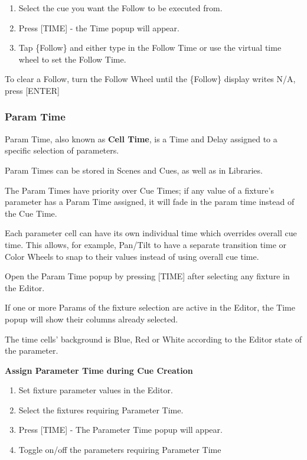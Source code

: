 \documentclass[
]{article}
\begin{document}
\begin{enumerate}
\def\labelenumi{\arabic{enumi}.}
\item
  Select the cue you want the Follow to be executed from.
\item
  Press {[}TIME{]} - the Time popup will appear.
\item
  Tap \{Follow\} and either type in the Follow Time or use the virtual time wheel to set the Follow Time.
\end{enumerate}

To clear a Follow, turn the Follow Wheel until the \{Follow\} display writes N/A, press {[}ENTER{]}

\hypertarget{param-time}{%
\subsubsection{Param Time}\label{param-time}}

Param Time, also known as \textbf{Cell Time}, is a Time and Delay assigned to a specific selection of parameters.

Param Times can be stored in Scenes and Cues, as well as in Libraries.

The Param Times have priority over Cue Times; if any value of a fixture's parameter has a Param Time assigned, it will fade in the param time instead of the Cue Time.

Each parameter cell can have its own individual time which overrides overall cue time. This allows, for example, Pan/Tilt to have a separate transition time or Color Wheels to snap to their values instead of using overall cue time.

Open the Param Time popup by pressing {[}TIME{]} after selecting any fixture in the Editor.

If one or more Params of the fixture selection are active in the Editor, the Time popup will show their columns already selected.

The time cells' background is Blue, Red or White according to the Editor state of the parameter.

\textbf{Assign Parameter Time during Cue Creation}

\begin{enumerate}
\def\labelenumi{\arabic{enumi}.}
\item
  Set fixture parameter values in the Editor.
\item
  Select the fixtures requiring Parameter Time.
\item
  Press {[}TIME{]} - The Parameter Time popup will appear.
\item
  Toggle on/off the parameters requiring Parameter Time
\end{enumerate}
\end{document}
